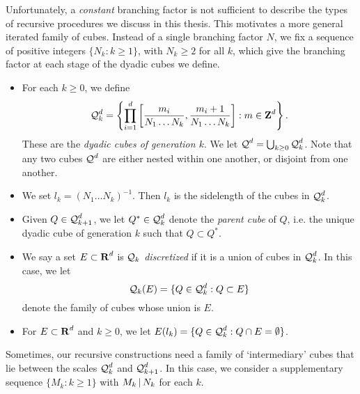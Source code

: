 Unfortunately, a \emph{constant} branching factor is not sufficient to describe the types of recursive procedures we discuss in this thesis. This motivates a more general iterated family of cubes. Instead of a single branching factor $N$, we fix a sequence of positive integers $\{ N_k : k \geq 1 \}$, with $N_k \geq 2$ for all $k$, which give the branching factor at each stage of the dyadic cubes we define.
%
\begin{itemize}
	\item For each $k \geq 0$, we define 
	\[ \operatorname{\mathcal{Q}}_k^d = \left\{ \prod_{i = 1}^d \left[ \frac{m_i}{N_1 \dots N_k}, \frac{m_i + 1}{N_1 \dots N_k} \right] : m \in \operatorname{\mathbf{Z}}^d \right\}. \]
	These are the \emph{dyadic cubes of generation $k$}. We let $\operatorname{\mathcal{Q}}^d = \bigcup_{k \geq 0} \operatorname{\mathcal{Q}}_k^d$. Note that any two cubes $\operatorname{\mathcal{Q}}^d$ are either nested within one another, or disjoint from one another.

	\item We set $l_k = (N_1 \dots N_k)^{-1}$. Then $l_k$ is the sidelength of the cubes in $\operatorname{\mathcal{Q}}_k^d$.

	\item Given $Q \in \operatorname{\mathcal{Q}}_{k+1}^d$, we let $Q^* \in \operatorname{\mathcal{Q}}_k^d$ denote the \emph{parent cube} of $Q$, i.e. the unique dyadic cube of generation $k$ such that $Q \subset Q^*$.

	\item We say a set $E \subset \operatorname{\mathbf{R}}^d$ is \emph{$\operatorname{\mathcal{Q}}_k$ discretized} if it is a union of cubes in $\operatorname{\mathcal{Q}}_k^d$. In this case, we let
	\[ \operatorname{\mathcal{Q}}_k(E) = \{ Q \in \operatorname{\mathcal{Q}}_k^d: Q \subset E \} \]
	denote the family of cubes whose union is $E$.

	\item For $E \subset \operatorname{\mathbf{R}}^d$ and $k \geq 0$, we let $E(l_k) = \{ Q \in \operatorname{\mathcal{Q}}_k^d : Q \cap E = \emptyset \}$.
\end{itemize}
%
%
Sometimes, our recursive constructions need a family of `intermediary' cubes that lie between the scales $\operatorname{\mathcal{Q}}_k^d$ and $\operatorname{\mathcal{Q}}_{k+1}^d$. In this case, we consider a supplementary sequence $\{ M_k : k \geq 1 \}$ with $M_k \operatorname{\mid} N_k$ for each $k$.
